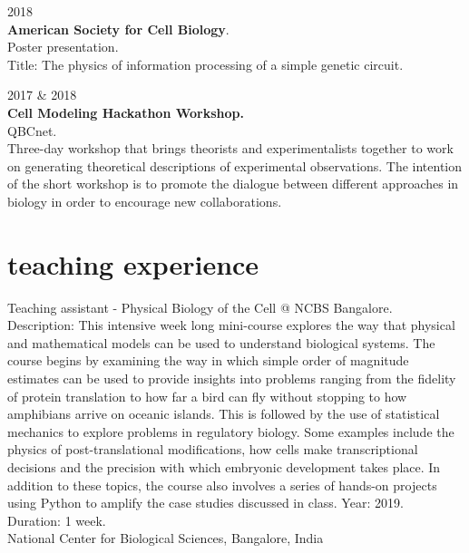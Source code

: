 \documentclass[]{friggeri-cv}
\begin{document}
{\small{} 2018}\\
\textbf{American Society for Cell Biology}.\\
{Poster presentation.}\\
Title: The physics of information processing of a simple genetic circuit.

{\small{} 2017 \& 2018 }\\
\textbf{Cell Modeling Hackathon Workshop.}\\
{QBCnet.}\\
Three-day workshop that brings theorists and experimentalists together to work on generating theoretical descriptions of experimental observations. The intention of the short workshop is to promote the dialogue between different approaches in biology in order to encourage new collaborations.

\pagebreak

\section{teaching experience}

Teaching assistant - Physical Biology of the Cell @ NCBS Bangalore.\\
Description: This intensive week long mini-course explores the way that physical and mathematical models can be used to understand biological systems. The course begins by examining the way in which simple order of magnitude estimates can be used to provide insights into problems ranging from the fidelity of protein translation to how far a bird can fly without stopping to how amphibians arrive on oceanic islands. This is followed by the use of statistical mechanics to explore problems in regulatory biology. Some examples include the physics of post-translational modifications, how cells make transcriptional decisions and the precision with which embryonic development takes place. In addition to these topics, the course also involves a series of hands-on projects using Python to amplify the case studies discussed in class.
Year: 2019.\\
Duration: 1 week.\\
{National Center for Biological Sciences, Bangalore, India}\\
\end{document}
